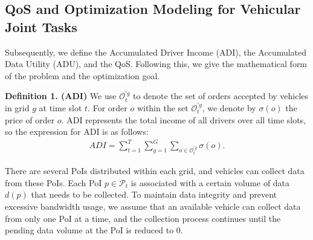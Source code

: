 \subsection{QoS and Optimization Modeling for Vehicular Joint Tasks}
\label{ssec:optimization-qos}

Subsequently, we define the Accumulated Driver Income (ADI), the Accumulated Data Utility (ADU), and the QoS. Following this, we give the mathematical form of the problem and the optimization goal.

\noindent\textbf{Definition 1. (ADI)} We use $\mathcal{O}_t^{'g}$ to denote the set of orders accepted by vehicles in grid $g$ at time slot $t$. For order $o$ within the set $\mathcal{O}_t^{'g}$, we denote by $\sigma(o)$ the price of order $o$. ADI represents the total income of all drivers over all time slots, so the expression for ADI is as follows: 
\begin{align}
ADI 
    = \sum\limits^{T}_{t=1} \sum\limits^{G}_{g=1}\sum\limits^{}_{o \in \mathcal{O}_t^{'g}} \sigma(o).
\end{align}

There are several PoIs distributed within each grid, and vehicles can collect data from these PoIs. Each PoI $p \in \mathcal{P}_t$  is associated with a certain volume of data $d(p)$ that needs to be collected. To maintain data integrity and prevent excessive bandwidth usage, we assume that an available vehicle can collect data from only one PoI at a time, and the collection process continues until the pending data volume at the PoI is reduced to 0. 










